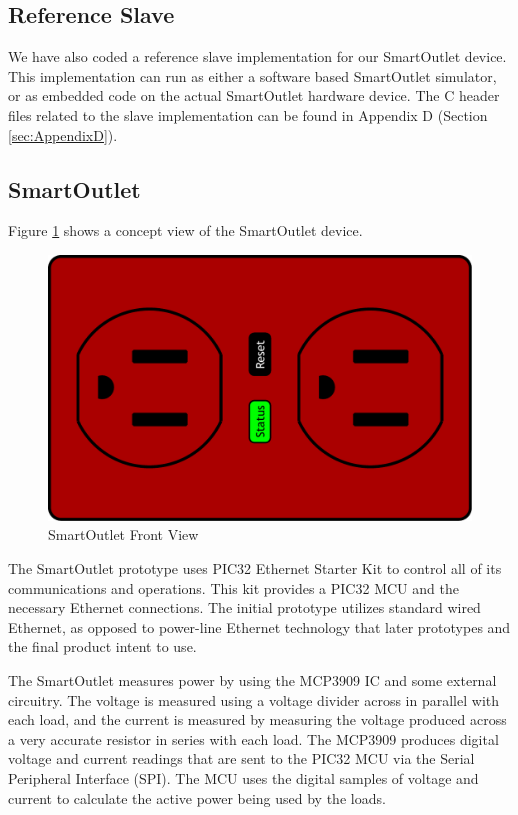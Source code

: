 \documentclass[12pt]{article}
\begin{document}
\subsection{Reference Slave}
\label{sec:Implementaion.ReferenceSlave}
We have also coded a reference slave implementation for our SmartOutlet
device. This implementation can run as either a software based
SmartOutlet simulator, or as embedded code on the actual SmartOutlet
hardware device. The C header files related to the slave implementation
can be found in Appendix D (Section \ref{sec:AppendixD}).

\subsection{SmartOutlet}

Figure \ref{fig:outletFront} shows a concept view of the SmartOutlet device.

\begin{figure}
  \begin{center}
    \includegraphics[scale=.5]{outlet.pdf}
  \end{center}
  \caption{SmartOutlet Front View}
  \label{fig:outletFront}
\end{figure}

The SmartOutlet prototype uses PIC32 Ethernet Starter Kit to control
all of its communications and operations. This kit provides a PIC32
MCU and the necessary Ethernet connections. The initial prototype
utilizes standard wired Ethernet, as opposed to power-line Ethernet
technology that later prototypes and the final product intent to use.

The SmartOutlet measures power by using the MCP3909 IC and some
external circuitry.  The voltage is measured using a voltage divider
across in parallel with each load, and the current is measured by
measuring the voltage produced across a
very accurate resistor in series with each load.
The MCP3909 produces digital voltage and current
readings that are sent to the PIC32 MCU via the Serial Peripheral
Interface (SPI). The MCU uses the digital samples of voltage and
current to calculate the active power being used by the loads.
\end{document}
